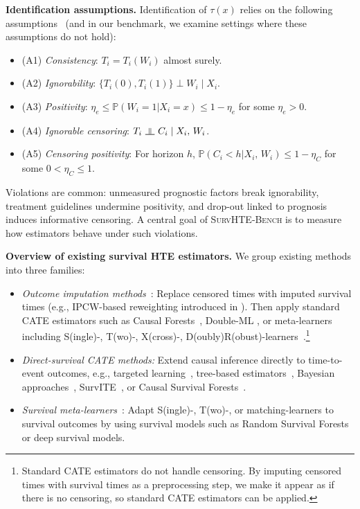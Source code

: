 \textbf{Identification assumptions.}
Identification of $\tau(x)$ relies on the following assumptions~\citep{ch04:cui2023estimating} (and in our benchmark, we examine settings where these assumptions do not hold):
\begin{itemize}
    \item (A1) \textit{Consistency}: %
    $T_i = T_i(W_i)$ almost surely.
    \item (A2) \textit{Ignorability}: %
    $\{ T_i(0), T_i(1)\} \perp W_i \mid X_i$.
    \item (A3) \textit{Positivity}: %
    $\eta_e \leq \mathbb P ({W_i = 1 | X_i=x}) \leq 1 - \eta_e$ for some $\eta_e>0$.
    \item (A4) \textit{Ignorable censoring}: %
    $T_i ~\ChFourIndep~ C_i \mid X_i, \, W_i$.
    \item (A5) \textit{Censoring positivity}: For horizon $h$, 
    $\mathbb P ({C_i < h | X_i, \, W_i}) \leq 1 - \eta_C$ for some $0 < \eta_C \leq 1$.
\end{itemize}
Violations are common: unmeasured prognostic factors break ignorability, treatment guidelines undermine positivity, and drop-out linked to prognosis induces informative censoring.  
A central goal of \textsc{SurvHTE‐Bench} is to measure how estimators behave under such violations. %

\textbf{Overview of existing survival HTE estimators.}
We group existing methods into three families:
\begin{itemize}
    \item \textit{Outcome imputation methods}~\citep{xu2024estimating,meir2025heterogeneous}: Replace censored times with imputed survival times (e.g., IPCW-based reweighting introduced in \cite{qi2023an}).
Then apply standard CATE estimators such as Causal Forests~\citep{athey2019grf}, Double-ML \citep{chernozhukov2018double}, or meta-learners including S(ingle)-, T(wo)-, X(cross)-, D(oubly)R(obust)-learners~\citep{athey2015machine,ch04:kunzel2019metalearners,kennedy2023towards}.\footnote{Standard CATE estimators do not handle censoring. By imputing censored times with survival times as a preprocessing step, we make it appear as if there is no censoring, so standard CATE estimators can be applied.}
    \item \textit{Direct-survival CATE methods:} Extend causal inference directly to time-to-event outcomes, e.g., targeted learning~\citep{van2011targeted}, 
    tree-based estimators~\citep{zhang2017mining}, Bayesian approaches~\citep{henderson2020individualized}, SurvITE~\citep{curth2021survite}, or Causal Survival Forests~\citep{ch04:cui2023estimating}.
    \item \textit{Survival meta-learners}~\citep{xu2023treatment,bo2024ameta,noroozizadeh2025impact}: Adapt S(ingle)-, T(wo)-, or matching-learners to survival outcomes by using survival models such as Random Survival Forests or deep survival models.
\end{itemize}
